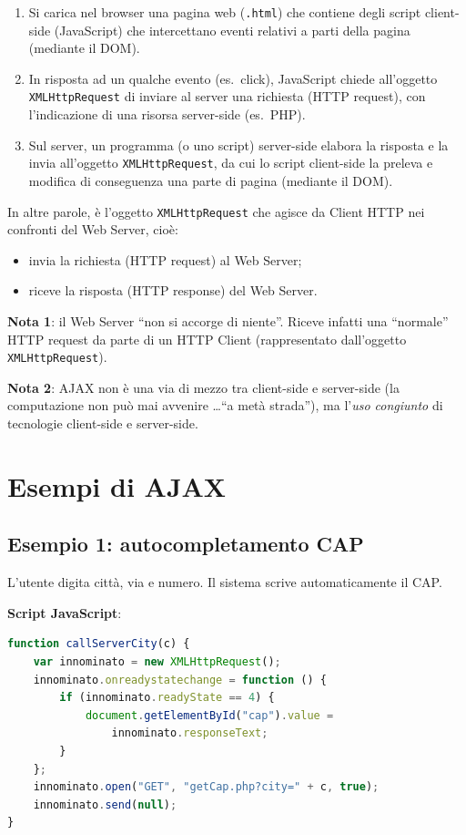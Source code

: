 \begin{enumerate}
    \item Si carica nel browser una pagina web (\texttt{.html}) che contiene degli script client-side (JavaScript) che intercettano eventi relativi a parti della pagina (mediante il DOM).
    \item In risposta ad un qualche evento (es.\ click), JavaScript chiede all'oggetto \texttt{XMLHttpRequest} di inviare al server una richiesta (HTTP request), con l'indicazione di una risorsa server-side (es.\ PHP).
    \item Sul server, un programma (o uno script) server-side elabora la risposta e la invia all'oggetto \texttt{XMLHttpRequest}, da cui lo script client-side la preleva e modifica di conseguenza una parte di pagina (mediante il DOM).
\end{enumerate}

In altre parole, è l'oggetto \texttt{XMLHttpRequest} che agisce da Client HTTP nei confronti del Web Server, cioè:
\begin{itemize}
    \item invia la richiesta (HTTP request) al Web Server;
    \item riceve la risposta (HTTP response) del Web Server.
\end{itemize}

\textbf{Nota 1}: il Web Server ``non si accorge di niente''. Riceve infatti una ``normale'' HTTP request da parte di un HTTP Client (rappresentato dall'oggetto \texttt{XMLHttpRequest}).

\textbf{Nota 2}: AJAX non è una via di mezzo tra client-side e server-side (la computazione non può mai avvenire \dots ``a metà strada''), ma l'\textit{uso congiunto} di tecnologie client-side e server-side.

\section{Esempi di AJAX}

\subsection{Esempio 1: autocompletamento CAP}

L'utente digita città, via e numero. Il sistema scrive automaticamente il CAP.

\textbf{Script JavaScript}:

\begin{lstlisting}[language=JavaScript]
function callServerCity(c) {
    var innominato = new XMLHttpRequest();
    innominato.onreadystatechange = function () {
        if (innominato.readyState == 4) {
            document.getElementById("cap").value =
                innominato.responseText;
        }
    };
    innominato.open("GET", "getCap.php?city=" + c, true);
    innominato.send(null);
}
\end{lstlisting}

